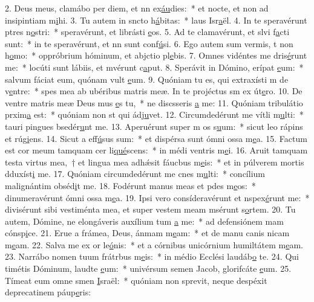 2. Deus meus, clamábo per diem, et nn ex\uline{áu}dies:~* et nocte, et non ad insipintiam m\uline{i}hi.
3. Tu autem in sncto h\uline{á}bitas:~* laus Isr\uline{a}ël.
4. In te speravérunt ptres n\uline{o}stri:~* speravérunt, et librásti \uline{e}os.
5. Ad te clamavérunt, et slvi f\uline{a}cti sunt:~* in te speravérunt, et nn sunt conf\uline{ú}si.
6. Ego autem sum vermis, t non h\uline{o}mo:~* oppróbrium hóminum, et abjctio pl\uline{e}bis.
7. Omnes vidéntes me dris\uline{é}runt me:~* locúti sunt lábiis, et mvérunt c\uline{a}put.
8. Sperávit in Dómino, erípat \uline{e}um:~* salvum fáciat eum, quónam vult \uline{e}um.
9. Quóniam tu es, qui extraxísti m de v\uline{e}ntre:~* spes mea ab ubéribus matris meæ. In te projéctus sm ex út\uline{e}ro.
10. De ventre matris meæ Deus mus \uline{e}s tu,~* ne discsseris \uline{a} me:
11. Quóniam tribulátio prxim\uline{a} est:~* quóniam non st qui ádj\uline{u}vet.
12. Circumdedérunt me vítli m\uline{u}lti:~* tauri pingues bsedér\uline{u}nt me.
13. Aperuérunt super m os s\uline{u}um:~* sicut leo rápins et rúg\uline{i}ens.
14. Sicut a eff\uline{ú}sus sum:~* et dispérsa sunt ómni ossa m\uline{e}a.
15. Factum est cor meum tamquam cer li\uline{qué}scens:~* in médi ventris m\uline{e}i.
16. Aruit tamquam testa virtus mea,~† et lingua mea adhǽsit fáucbus m\uline{e}is:~* et in púlverem mortis dduxíst\uline{i} me.
17. Quóniam circumdedérunt me cnes m\uline{u}lti:~* concílium malignántim obséd\uline{i}t me.
18. Fodérunt manus meas et pdes m\uline{e}os:~* dinumeravérunt ómni ossa m\uline{e}a.
19. Ipsi vero consíderavérunt et nspex\uline{é}runt me:~* divisérunt sibi vestiménta mea, et super vestem meam msérunt s\uline{o}rtem.
20. Tu autem, Dómine, ne elongáveris auxílium tum \uline{a} me:~* ad defensiónem mam cónsp\uline{i}ce.
21. Erue a frámea, Deus, ánmam m\uline{e}am:~* et de manu canis nicam m\uline{e}am.
22. Salva me ex or le\uline{ó}nis:~* et a córnibus unicórnium humiltátem m\uline{e}am.
23. Narrábo nomen tuum frátrbus m\uline{e}is:~* in médio Ecclési laudáb\uline{o} te.
24. Qui timétis Dóminum, laudte \uline{e}um:~* univérsum semen Jacob, glorifcáte \uline{e}um.
25. Tímeat eum omne smen \uline{I}sraël:~* quóniam non sprevit, neque despéxit deprecatinem páup\uline{e}ris:
